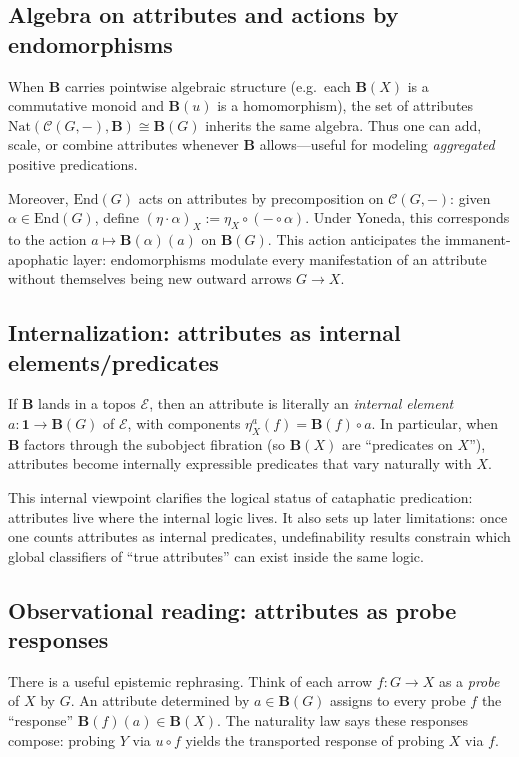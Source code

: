 \documentclass[11pt]{article}
\theoremstyle{upright}
\begin{document}
\subsection{Algebra on attributes and actions by endomorphisms}
When \(\mathbf B\) carries pointwise algebraic structure (e.g.\ each \(\mathbf B(X)\) is a commutative monoid and \(\mathbf B(u)\) is a homomorphism), the set of attributes \(\mathrm{Nat}(\mathcal C(G,-),\mathbf B)\cong\mathbf B(G)\) inherits the same algebra. Thus one can add, scale, or combine attributes whenever \(\mathbf B\) allows—useful for modeling \emph{aggregated} positive predications.

Moreover, \(\mathrm{End}(G)\) acts on attributes by precomposition on \(\mathcal C(G,-)\): given \(\alpha\in\mathrm{End}(G)\), define \((\eta\cdot\alpha)_X:=\eta_X\circ(-\circ\alpha)\). Under Yoneda, this corresponds to the action \(a\mapsto \mathbf B(\alpha)(a)\) on \(\mathbf B(G)\). This action anticipates the immanent-apophatic layer: endomorphisms modulate every manifestation of an attribute without themselves being new outward arrows \(G\to X\).

\subsection{Internalization: attributes as internal elements/predicates}
If \(\mathbf B\) lands in a topos \(\mathcal E\), then an attribute is literally an \emph{internal element} \(a:\mathbf 1\to \mathbf B(G)\) of \(\mathcal E\), with components \(\eta^a_X(f)=\mathbf B(f)\circ a\). In particular, when \(\mathbf B\) factors through the subobject fibration (so \(\mathbf B(X)\) are “predicates on \(X\)”), attributes become internally expressible predicates that vary naturally with \(X\).

This internal viewpoint clarifies the logical status of cataphatic predication: attributes live where the internal logic lives. It also sets up later limitations: once one counts attributes as internal predicates, undefinability results \citep{Tarski1956} constrain which global classifiers of “true attributes” can exist inside the same logic.

\subsection{Observational reading: attributes as probe responses}
There is a useful epistemic rephrasing. Think of each arrow \(f:G\to X\) as a \emph{probe} of \(X\) by \(G\). An attribute determined by \(a\in\mathbf B(G)\) assigns to every probe \(f\) the “response” \(\mathbf B(f)(a)\in\mathbf B(X)\). The naturality law says these responses compose: probing \(Y\) via \(u\circ f\) yields the transported response of probing \(X\) via \(f\).
\end{document}
